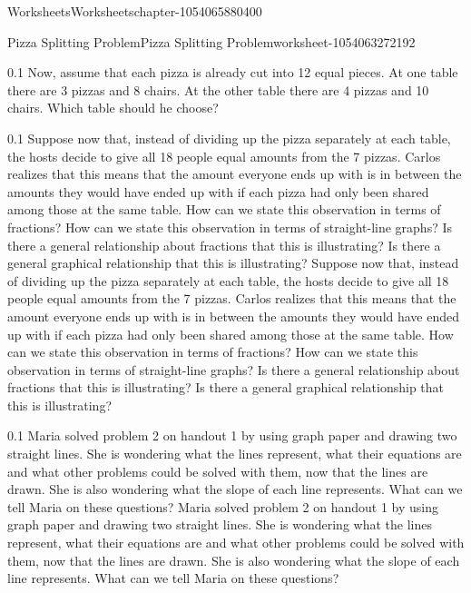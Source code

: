 \documentclass[twoside,11pt,]{book}
\begin{document}
\begin{chapterptx}{Worksheets}{}{Worksheets}{}{}{chapter-1054065880400}
\begin{worksheet-section-numberless}{Pizza Splitting Problem}{}{Pizza Splitting Problem}{}{}{worksheet-1054063272192}
\begin{divisionexercise}{2}{}{0.1}
{      }%
\hypertarget{p-1054066810608}{}%
Now, assume that each pizza is already cut into 12 equal pieces. At one table there are 3 pizzas and 8 chairs.  At the other table there are 4 pizzas and 10 chairs.  Which table should he choose?%
\end{divisionexercise}%
\begin{divisionexercise}{3}{}{0.1}{
        Suppose now that, instead of dividing up the pizza separately at each table, the hosts decide to give all 18 people equal amounts from the 7 pizzas.  Carlos realizes that this means that the amount everyone ends up with is in between the amounts they would have ended up with if each pizza had only been shared among those at the same table.  How can we state this observation in terms of fractions?  How can we state this observation in terms of straight-line graphs?  Is there a general relationship about fractions that this is illustrating?  Is there a general graphical relationship that this is illustrating?
      }%
\hypertarget{p-1054063184288}{}%
Suppose now that, instead of dividing up the pizza separately at each table, the hosts decide to give all 18 people equal amounts from the 7 pizzas.  Carlos realizes that this means that the amount everyone ends up with is in between the amounts they would have ended up with if each pizza had only been shared among those at the same table.  How can we state this observation in terms of fractions?  How can we state this observation in terms of straight-line graphs?  Is there a general relationship about fractions that this is illustrating?  Is there a general graphical relationship that this is illustrating?%
\end{divisionexercise}%
\clearpage
\begin{divisionexercise}{4}{}{0.1}{
        Maria solved problem 2 on handout 1 by using graph paper and drawing two straight lines.  She is wondering what the lines represent, what their equations are and what other problems could be solved with them, now that the lines are drawn.  She is also wondering what the slope of each line represents.  What can we tell Maria on these questions?
      }%
\hypertarget{p-1054063174672}{}%
Maria solved problem 2 on handout 1 by using graph paper and drawing two straight lines.  She is wondering what the lines represent, what their equations are and what other problems could be solved with them, now that the lines are drawn.  She is also wondering what the slope of each line represents.  What can we tell Maria on these questions?%
\begin{sidebyside}{1}{0.05}{0.05}{0}%

\end{sidebyside}
\end{divisionexercise}
\end{worksheet-section-numberless}
\end{chapterptx}
\end{document}
